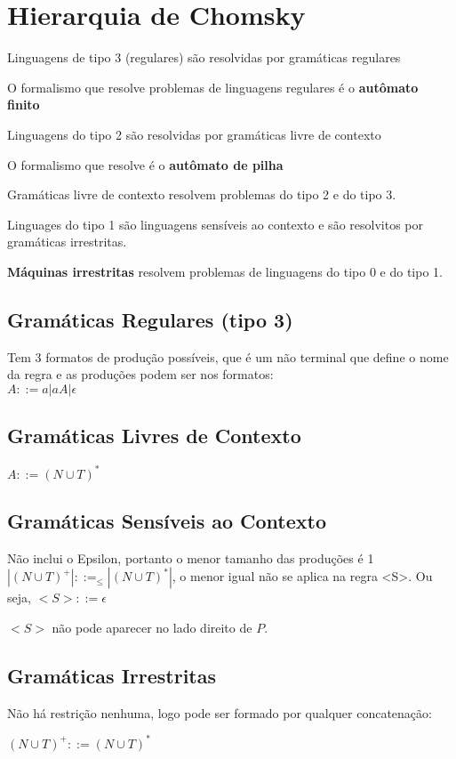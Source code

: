 \documentclass[]{article}
\begin{document}
	\section{Hierarquia de Chomsky}
	Linguagens de tipo 3 (regulares) são resolvidas por gramáticas regulares
	
	O formalismo que resolve problemas de linguagens regulares é o \textbf{autômato finito}
	
	Linguagens do tipo 2 são resolvidas por gramáticas livre de contexto
	
	O formalismo que resolve é o \textbf{autômato de pilha}
	
	Gramáticas livre de contexto resolvem problemas do tipo 2 e do tipo 3.
	
	Linguages do tipo 1 são linguagens sensíveis ao contexto e são resolvitos por gramáticas irrestritas.
	
	\textbf{Máquinas irrestritas} resolvem problemas de linguagens do tipo 0 e do tipo 1.
	
	\subsection{Gramáticas Regulares (tipo 3)}
		Tem 3 formatos de produção possíveis, que é um não terminal que define o nome da regra e as produções podem ser nos formatos:\\
		$A::= a | aA| \epsilon$
	\subsection{Gramáticas Livres de Contexto}
		$A::=(N\cup T)^*$
	\subsection{Gramáticas Sensíveis ao Contexto}
		Não inclui o Epsilon, portanto o menor tamanho das produções é 1\\
		$ |(N \cup T)^{+}|::= _{\leq} |(N \cup T)^*|$, o menor igual não se aplica na regra <S>. Ou seja, $<S> ::= \epsilon$
		
		$<S>$ não pode aparecer no lado direito de $P$.
		
	\subsection{Gramáticas Irrestritas}
		Não há restrição nenhuma, logo pode ser formado por qualquer concatenação:
		
		$(N\cup T)^+ ::= (N\cup T)^*$
	
\end{document}
